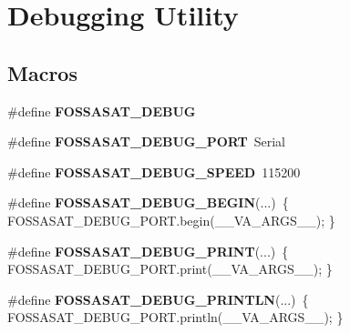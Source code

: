 \hypertarget{group__debugging__h__defines}{}\section{Debugging Utility}
\label{group__debugging__h__defines}
\subsection*{Macros}
\begin{DoxyCompactItemize}
\item 
\mbox{\label{group__debugging__h__defines_gac2c7820060c166dde1fb4ee57949e16f}} 
\#define {\bfseries F\+O\+S\+S\+A\+S\+A\+T\+\_\+\+D\+E\+B\+UG}
\item 
\mbox{\label{group__debugging__h__defines_ga01c1d95ee747390a841f87529ca6eda1}} 
\#define {\bfseries F\+O\+S\+S\+A\+S\+A\+T\+\_\+\+D\+E\+B\+U\+G\+\_\+\+P\+O\+RT}~Serial
\item 
\mbox{\label{group__debugging__h__defines_ga222f840c0273a7c14b37d689ba45501c}} 
\#define {\bfseries F\+O\+S\+S\+A\+S\+A\+T\+\_\+\+D\+E\+B\+U\+G\+\_\+\+S\+P\+E\+ED}~115200
\item 
\mbox{\label{group__debugging__h__defines_ga08e005173cbb2de7f1ed6fae03cedf9f}} 
\#define {\bfseries F\+O\+S\+S\+A\+S\+A\+T\+\_\+\+D\+E\+B\+U\+G\+\_\+\+B\+E\+G\+IN}(...)~\{ F\+O\+S\+S\+A\+S\+A\+T\+\_\+\+D\+E\+B\+U\+G\+\_\+\+P\+O\+R\+T.\+begin(\+\_\+\+\_\+\+V\+A\+\_\+\+A\+R\+G\+S\+\_\+\+\_\+); \}
\item 
\mbox{\label{group__debugging__h__defines_gaa825f0c9ffcfeff331d7843ba749a104}} 
\#define {\bfseries F\+O\+S\+S\+A\+S\+A\+T\+\_\+\+D\+E\+B\+U\+G\+\_\+\+P\+R\+I\+NT}(...)~\{ F\+O\+S\+S\+A\+S\+A\+T\+\_\+\+D\+E\+B\+U\+G\+\_\+\+P\+O\+R\+T.\+print(\+\_\+\+\_\+\+V\+A\+\_\+\+A\+R\+G\+S\+\_\+\+\_\+); \}
\item 
\mbox{\label{group__debugging__h__defines_ga065c558f3c794981a1a217f5382226ab}} 
\#define {\bfseries F\+O\+S\+S\+A\+S\+A\+T\+\_\+\+D\+E\+B\+U\+G\+\_\+\+P\+R\+I\+N\+T\+LN}(...)~\{ F\+O\+S\+S\+A\+S\+A\+T\+\_\+\+D\+E\+B\+U\+G\+\_\+\+P\+O\+R\+T.\+println(\+\_\+\+\_\+\+V\+A\+\_\+\+A\+R\+G\+S\+\_\+\+\_\+); \}

\end{DoxyCompactItemize}
